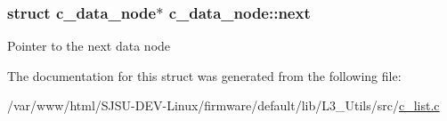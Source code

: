 \subsubsection[{\texorpdfstring{next}{next}}]{\setlength{\rightskip}{0pt plus 5cm}struct {\bf c\+\_\+data\+\_\+node}$\ast$ c\+\_\+data\+\_\+node\+::next}\hypertarget{structc__data__node_aaa2bf8d750ad19558b6514499b8a2420}{}\label{structc__data__node_aaa2bf8d750ad19558b6514499b8a2420}
Pointer to the next data node 

The documentation for this struct was generated from the following file\+:\begin{DoxyCompactItemize}
\item 
/var/www/html/\+S\+J\+S\+U-\/\+D\+E\+V-\/\+Linux/firmware/default/lib/\+L3\+\_\+\+Utils/src/\hyperlink{c__list_8c}{c\+\_\+list.\+c}\end{DoxyCompactItemize}
